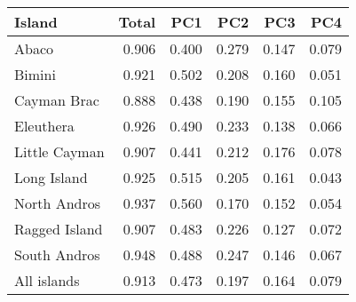 
\begin{tabular}{lrrrrr}
\toprule
Island & Total & PC1 & PC2 & PC3 & PC4\\
\midrule
Abaco & 0.906 & 0.400 & 0.279 & 0.147 & 0.079\\
Bimini & 0.921 & 0.502 & 0.208 & 0.160 & 0.051\\
Cayman Brac & 0.888 & 0.438 & 0.190 & 0.155 & 0.105\\
Eleuthera & 0.926 & 0.490 & 0.233 & 0.138 & 0.066\\
Little Cayman & 0.907 & 0.441 & 0.212 & 0.176 & 0.078\\
Long Island & 0.925 & 0.515 & 0.205 & 0.161 & 0.043\\
North Andros & 0.937 & 0.560 & 0.170 & 0.152 & 0.054\\
Ragged Island & 0.907 & 0.483 & 0.226 & 0.127 & 0.072\\
South Andros & 0.948 & 0.488 & 0.247 & 0.146 & 0.067\\
All islands & 0.913 & 0.473 & 0.197 & 0.164 & 0.079\\
\bottomrule
\end{tabular}